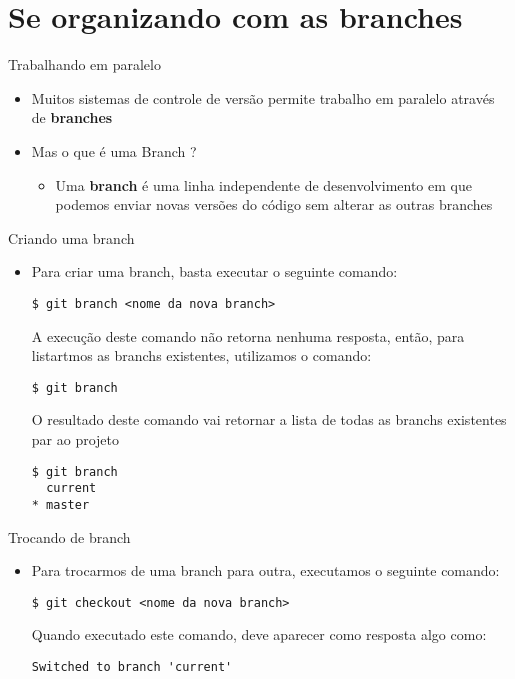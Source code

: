 \section{Se organizando com as branches}

\begin{slide}[method=direct]{Trabalhando em paralelo}
	\begin{itemize}
	\item{Muitos sistemas de controle de versão permite trabalho em paralelo através de \textbf{branches}}
	\item{Mas o que é uma Branch ?}
	\begin{itemize}
		\item{Uma \textbf{branch} é uma linha independente de desenvolvimento em que podemos enviar novas versões do código sem alterar as outras branches}
	\end{itemize}
	\end{itemize}
\end{slide}

\begin{slide}[method=direct]{Criando uma branch}
	\begin{itemize}
	\item{Para criar uma branch, basta executar o seguinte comando:
		\begin{lstlisting}[style=Bash]
$ git branch <nome da nova branch>
		\end{lstlisting}
		A execução deste comando não retorna nenhuma resposta, então, para listartmos as branchs existentes, utilizamos o comando:
		\begin{lstlisting}[style=Bash]
$ git branch
		\end{lstlisting}
		O resultado deste comando vai retornar a lista de todas as branchs existentes par ao projeto
		\begin{lstlisting}[style=Bash]
$ git branch
  current
* master
                   \end{lstlisting}
	         }
	\end{itemize}
\end{slide}

\begin{slide}[method=direct]{Trocando de branch}
	\begin{itemize}
	\item{Para trocarmos de uma branch para outra, executamos o seguinte comando:
	\begin{lstlisting}[style=Bash]
$ git checkout <nome da nova branch>
	\end{lstlisting}
	Quando executado este comando, deve aparecer como resposta algo como:
	\begin{lstlisting}[style=Bash]
Switched to branch 'current'
	\end{lstlisting}
	}
	\end{itemize}
\end{slide}

